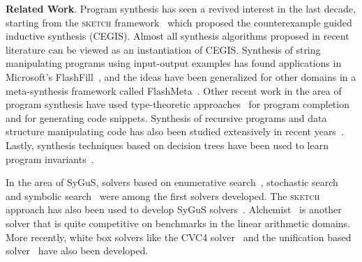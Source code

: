 \documentclass{llncs}
\newcommand{\sygus}{{\sffamily\fontsize{8.5}{10}\selectfont
    SyGuS}\xspace}
\renewcommand{\paragraph}[1]{\par\noindent\textbf{#1}.}
\newcommand{\sketch}{\textsc{sketch}\xspace}
\begin{document}
\paragraph{Related Work}
Program synthesis has seen a revived interest in the last decade,
starting from the \sketch
framework~\cite{solar-lezama-05,solar-lezama-06} which
proposed the counterexample guided inductive
synthesis (CEGIS). Almost all synthesis
algorithms proposed in recent literature
can be viewed as an instantiation of CEGIS.
Synthesis of string manipulating programs using input-output
examples has found applications in Microsoft's
FlashFill~\cite{gulwani-popl-11}, and the ideas have been generalized
for other domains in a meta-synthesis framework called
FlashMeta~\cite{polozov-15}.
Other recent work in the area of program synthesis have
used type-theoretic approaches~\cite{gvero-13,osera-15,frankle-16} for
program completion and for generating code snippets.
Synthesis of recursive programs and data structure manipulating code
has also been studied extensively in recent
years~\cite{kuncak-10,kneuss-13,albarghouthi-13,feser-15}.
Lastly, synthesis techniques based on decision trees have been used to
learn program invariants~\cite{garg-16}.

In the area of \sygus, solvers based on enumerative
search~\cite{udupa-transit}, stochastic
search~\cite{schkufza-13,udupa-sygus} and symbolic
search~\cite{gulwani-pldi-11,jha-10} were among the first solvers
developed. The \sketch approach has also been used to develop \sygus
solvers~\cite{jeon-15}. Alchemist~\cite{saha-15} is another solver
that is quite competitive on benchmarks in the linear arithmetic
domains. More recently, white box solvers like the CVC4
solver~\cite{reynolds-15} and the unification based
solver~\cite{alur-15} have also been developed.
\end{document}
